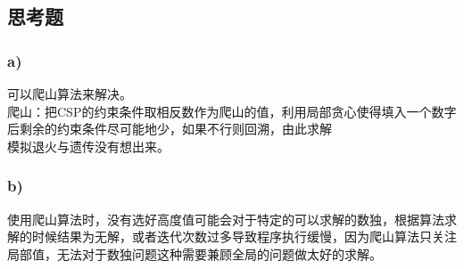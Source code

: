 \documentclass{article}
\begin{document}
	\subsection*{思考题}
	\subsubsection*{a)}
	可以爬山算法来解决。\\
	爬山：把CSP的约束条件取相反数作为爬山的值，利用局部贪心使得填入一个数字后剩余的约束条件尽可能地少，如果不行则回溯，由此求解\\
	模拟退火与遗传没有想出来。
	\subsubsection*{b)}
	使用爬山算法时，没有选好高度值可能会对于特定的可以求解的数独，根据算法求解的时候结果为无解，或者迭代次数过多导致程序执行缓慢，因为爬山算法只关注局部值，无法对于数独问题这种需要兼顾全局的问题做太好的求解。
\end{document}
